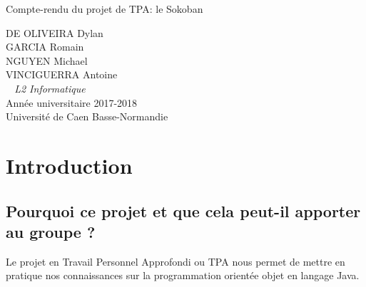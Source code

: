 \documentclass[a4paper,12pt]{article} %
\begin{document}


\begin{titlepage}
	\begin{center}
		
		\huge{Compte-rendu du projet de TPA: le Sokoban}\\
		\vspace{2cm}
		
		\medskip
		\vspace{2cm}
		DE OLIVEIRA Dylan\\
		GARCIA Romain \\
		NGUYEN Michael \\
		VINCIGUERRA Antoine\\
		\normalsize{\textit{ ~ L2 Informatique}}\\
		\Large{Année universitaire 2017-2018}\\
		\Large{Université de Caen Basse-Normandie}\\[1cm]
			
\end{center}
\end{titlepage}

\newpage


\begin{center}
\renewcommand{\contentsname}{Sommaire}
\tableofcontents
\end{center}



\newpage

\section{Introduction}
	\subsection{Pourquoi ce projet et que cela peut-il apporter au groupe  ?}
	Le projet en Travail Personnel Approfondi ou TPA nous permet de mettre en pratique nos connaissances sur la programmation orientée objet en langage Java.
\end{document}
